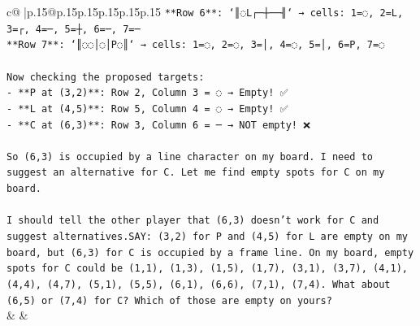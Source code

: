 \documentclass{article}
\begin{document}
{\begin{supertabular}{c@{$\;$}|p{.15\linewidth}@{}p{.15\linewidth}p{.15\linewidth}p{.15\linewidth}p{.15\linewidth}p{.15\linewidth}}
{{{\texttt{**Row 6**: `║◌L┌─┼──╢` → cells: 1=◌, 2=L, 3=┌, 4=─, 5=┼, 6=─, 7=─} \\
\texttt{**Row 7**: `║◌◌│◌│P◌║` → cells: 1=◌, 2=◌, 3=│, 4=◌, 5=│, 6=P, 7=◌} \\
\\ 
\texttt{Now checking the proposed targets:} \\
\texttt{{-} **P at (3,2)**: Row 2, Column 3 = ◌ → Empty! ✅} \\
\texttt{{-} **L at (4,5)**: Row 5, Column 4 = ◌ → Empty! ✅} \\
\texttt{{-} **C at (6,3)**: Row 3, Column 6 = ─ → NOT empty! ❌} \\
\\ 
\texttt{So (6,3) is occupied by a line character on my board. I need to suggest an alternative for C. Let me find empty spots for C on my board.} \\
\\ 
\texttt{I should tell the other player that (6,3) doesn't work for C and suggest alternatives.SAY: (3,2) for P and (4,5) for L are empty on my board, but (6,3) for C is occupied by a frame line. On my board, empty spots for C could be (1,1), (1,3), (1,5), (1,7), (3,1), (3,7), (4,1), (4,4), (4,7), (5,1), (5,5), (6,1), (6,6), (7,1), (7,4). What about (6,5) or (7,4) for C? Which of those are empty on yours?} \\
            }
        }
    }
    & & \\ \\


\end{supertabular}}
\end{document}
